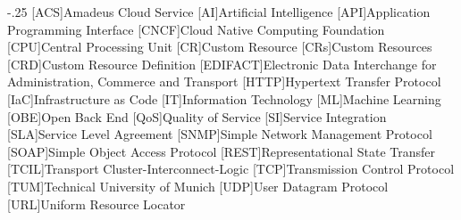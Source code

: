 \documentclass[headsepline,footsepline,footinclude=false,oneside,fontsize=11pt,paper=a4,listof=totoc,bibliography=totoc]{scrbook} %
\begin{document}


\frontmatter{}





\tableofcontents{}

\mainmatter{}

% 










\appendix{}


\begin{acronym}
	\itemsep-.25\baselineskip
	[ACS]{Amadeus Cloud Service}
	[AI]{Artificial Intelligence}
	[API]{Application Programming Interface}
	[CNCF]{Cloud Native Computing Foundation}
	[CPU]{Central Processing Unit}
	[CR]{Custom Resource}
	[CRs]{Custom Resources}
	[CRD]{Custom Resource Definition}
	[EDIFACT]{Electronic Data Interchange for Administration, Commerce and Transport}
	[HTTP]{Hypertext Transfer Protocol}
	[IaC]{Infrastructure as Code}
	[IT]{Information Technology}
	[ML]{Machine Learning}
	[OBE]{Open Back End}
	[QoS]{Quality of Service}
	[SI]{Service Integration}
	[SLA]{Service Level Agreement}
	[SNMP]{Simple Network Management Protocol}
	[SOAP]{Simple Object Access Protocol}
	[REST]{Representational State Transfer}
	[TCIL]{Transport Cluster-Interconnect-Logic}
	[TCP]{Transmission Control Protocol}
	[TUM]{Technical University of Munich}
	[UDP]{User Datagram Protocol}
	[URL]{Uniform Resource Locator}
\end{acronym}

\listoffigures{}
\listoftables{}
\printbibliography{}
\end{document}
